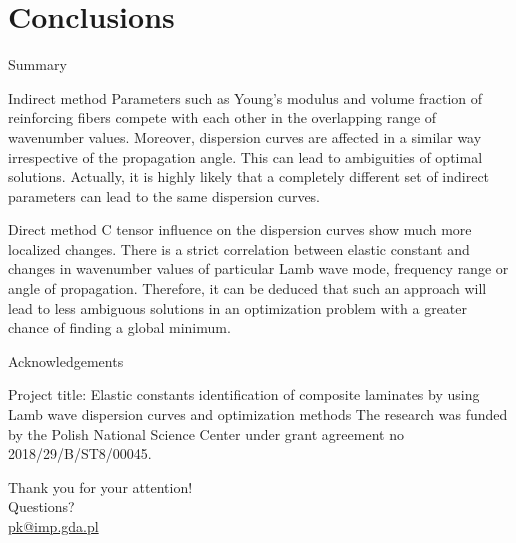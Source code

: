 \documentclass[10pt,aspectratio=169]{beamer} %
\begin{document}
\section{Conclusions}
\begin{frame}[t,label=frame29]{Summary}

		\begin{alertblock}{Indirect method}
		Parameters such as Young's modulus and volume fraction of reinforcing fibers compete with each other in the overlapping range of wavenumber values. Moreover, dispersion curves are affected in a similar way irrespective of the propagation angle. This can lead to ambiguities of optimal solutions. Actually, it is highly likely that a completely different set of indirect parameters can lead to the same dispersion curves.
	\end{alertblock}
   	\begin{alertblock}{Direct method}
   		C tensor influence on the dispersion curves show much more localized changes. There is a strict correlation between elastic constant and changes in wavenumber values of particular Lamb wave mode, frequency range or angle of propagation. Therefore, it can be deduced that such an approach will lead to less ambiguous solutions in an optimization problem with a greater chance of finding a global minimum.
    \end{alertblock}
\end{frame}
\begin{frame}[t,label=A]{Acknowledgements}
		\begin{alertblock}{Project title: Elastic constants identification of composite laminates by using Lamb wave dispersion curves and optimization methods}
The research was funded by the Polish National Science Center under grant agreement 
no 2018/29/B/ST8/00045. 
\end{alertblock}
\end{frame}	
{
\begin{frame}[standout]
  Thank you for your attention!\\ \vspace{12pt}
  Questions?\\ \vspace{12pt}
  \url{pk@imp.gda.pl}
\end{frame}
}
\end{document}
